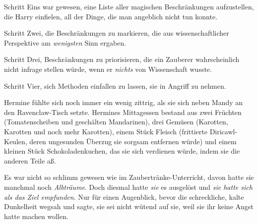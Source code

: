 Schritt Eins war gewesen, eine Liste aller magischen Beschränkungen aufzustellen, die Harry einfielen, all der Dinge, die man angeblich nicht tun konnte.

Schritt Zwei, die Beschränkungen zu markieren, die aus wissenschaftlicher Perspektive am \emph{wenigsten} Sinn ergaben.

Schritt Drei, Beschränkungen zu priorisieren, die ein Zauberer wahrscheinlich nicht infrage stellen würde, wenn er \emph{nichts} von Wissenschaft wusste.

Schritt Vier, sich Methoden einfallen zu lassen, sie in Angriff zu nehmen.

\later

Hermine fühlte sich noch immer ein wenig zittrig, als sie sich neben Mandy an den Ravenclaw-Tisch setzte. Hermines Mittagessen bestand aus zwei Früchten (Tomatenscheiben und geschälten Mandarinen), drei Gemüsen (Karotten, Karotten und noch mehr Karotten), einem Stück Fleisch (frittierte Diricawl-Keulen, deren ungesunden Überzug sie sorgsam entfernen würde) und einem kleinen Stück Schokoladenkuchen, das sie sich verdienen würde, indem sie die anderen Teile aß.

Es war nicht so schlimm gewesen wie im Zaubertränke-Unterricht, davon hatte sie manchmal noch \emph{Albträume}. Doch diesmal hatte \emph{sie} es ausgelöst und \emph{sie hatte sich als das Ziel empfunden}. Nur für einen Augenblick, bevor die schreckliche, kalte Dunkelheit wegsah und sagte, sie sei nicht wütend auf sie, weil sie ihr keine Angst hatte machen wollen.


